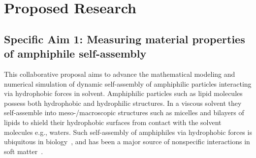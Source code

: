 \section{Proposed Research}
\label{sec:proposed-work}

\subsection{Specific Aim 1: Measuring material properties of amphiphile
  self-assembly}
\label{subsec:specific_aim_1}
This collaborative proposal aims to advance
the mathematical modeling and numerical simulation
of dynamic self-assembly of amphiphilic particles interacting
via hydrophobic forces in solvent.
Amphiphilic particles such as lipid molecules possess both hydrophobic
and hydrophilic structures. In a viscous solvent they self-assemble into
meso-/macroscopic structures such as micelles and bilayers of lipids to
shield their hydrophobic surfaces from contact with the solvent
molecules e.g., waters. Such self-assembly of amphiphiles via hydrophobic
forces is ubiquitous in biology~\cite{Israelachvili1954},
and has been a major source of nonspecific interactions 
in soft matter~\cite{Sanchez-IglesiasEtAl2012_ACSNano,
AltantzisEtAl2013_PSC, XieYangLuEtAl2020_COCIS}. 


